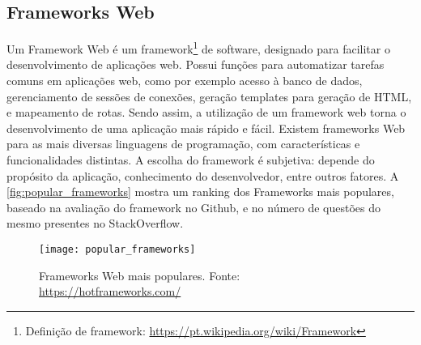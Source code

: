 	\subsection{Frameworks Web}
		Um Framework Web é um framework\footnote{Definição de framework: \url{https://pt.wikipedia.org/wiki/Framework}} de software, designado para facilitar o desenvolvimento de aplicações web. Possui funções para automatizar tarefas comuns em aplicações web, como por exemplo acesso à banco de dados, gerenciamento de sessões de conexões, geração templates para geração de HTML, e mapeamento de rotas. Sendo assim, a utilização de um framework web torna o desenvolvimento de uma aplicação mais rápido e fácil. Existem frameworks Web para as mais diversas linguagens de programação, com características e funcionalidades distintas. A escolha do framework é subjetiva: depende do propósito da aplicação, conhecimento do desenvolvedor, entre outros fatores. A \autoref{fig:popular_frameworks} mostra um ranking dos Frameworks mais populares, baseado na avaliação do framework no Github, e no número de questões do mesmo presentes no StackOverflow.
		
		\begin{figure}[!htb]	
			\captionsetup{justification=centering}
			\begin{center}
				\texttt{[image: popular\_frameworks]}  %
				\caption[Frameworks Web mais populares]{\label{fig:popular_frameworks} Frameworks Web mais populares. Fonte: \url{https://hotframeworks.com/}}
			\end{center}		
		\end{figure}
	
